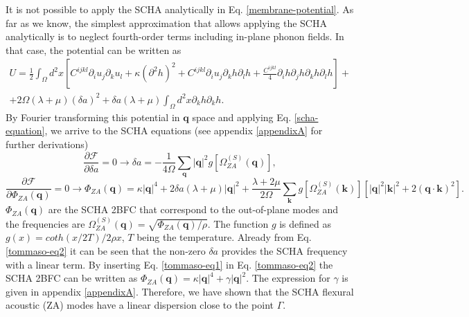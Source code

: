 It is not possible to apply the SCHA analytically in Eq. \ref{membrane-potential}. As far as we know, the simplest 
approximation that allows applying the SCHA analytically is to neglect fourth-order terms including in-plane phonon 
fields. In that case, the potential can be written as
\begin{multline}
\label{membrane-potential-tommaso}
U=\frac{1}{2}\int_{\Omega}d^{2}x[C^{ijkl}\partial_{i}u_{j}\partial_{k}u_{l}+\kappa(\partial^{2}h)^{2}+
C^{ijkl}\partial_{i}u_{j}\partial_{k}h\partial_{l}h+\frac{C^{ijkl}}{4}\partial_{i}h\partial_{j}h\partial_{k}h\partial_{l}h]+\\+2\Omega(\lambda+\mu)(\delta a)^{2}+\delta a(\lambda+\mu)\int_{\Omega}d^{2}x\partial_{k}h\partial_{k}h.
\end{multline}
By Fourier transforming this potential in $\boldsymbol{q}$ space and applying Eq. \ref{scha-equation}, we arrive to 
the SCHA equations (see appendix \ref{appendixA} for further derivations)
\begin{equation}
\label{tommaso-eq1}
\frac{\partial\mathcal{F}}{\partial\delta a}=0\rightarrow\delta a=-\frac{1}{4\Omega}\sum_{\boldsymbol{q}}|\boldsymbol{q}|^{2}g[\Omega_{ZA}^{(S)}(\boldsymbol{q})],
\end{equation}   
\begin{equation}
\label{tommaso-eq2}
\frac{\partial\mathcal{F}}{\partial\Phi_{ZA}(\boldsymbol{q})}=0\rightarrow\Phi_{ZA}(\boldsymbol{q})=\kappa|\boldsymbol{q}|^{4}+2\delta a(\lambda+\mu)|\boldsymbol{q}|^{2}+\frac{\lambda+2\mu}{2\Omega}\sum_{\boldsymbol{k}}g[\Omega_{ZA}^{(S)}(\boldsymbol{k})][|\boldsymbol{q}|^{2}|\boldsymbol{k}|^{2}+2(\boldsymbol{q}\cdot\boldsymbol{k})^{2}].
\end{equation}
$\Phi_{ZA}(\boldsymbol{q})$ are the SCHA 2BFC that correspond to the out-of-plane modes and the frequencies are 
$\Omega_{ZA}^{(S)}(\boldsymbol{q})=\sqrt{\Phi_{ZA}(\boldsymbol{q})/\rho}$. The function $g$ is defined as
\\ $g(x)=coth(x/2T)/2\rho x$, $T$ being the temperature. Already from Eq. \ref{tommaso-eq2} it can be seen that the 
non-zero $\delta a$ provides the SCHA frequency with a linear term. By inserting Eq. \ref{tommaso-eq1} in 
Eq. \ref{tommaso-eq2} the SCHA 2BFC can be written as 
$\Phi_{ZA}(\boldsymbol{q})=\kappa|\boldsymbol{q}|^{4}+\gamma|\boldsymbol{q}|^{2}$. The expression for $\gamma$ is 
given in appendix \ref{appendixA}. Therefore, we have shown that the SCHA flexural acoustic (ZA) modes have a linear 
dispersion close to the point $\Gamma$. \\

